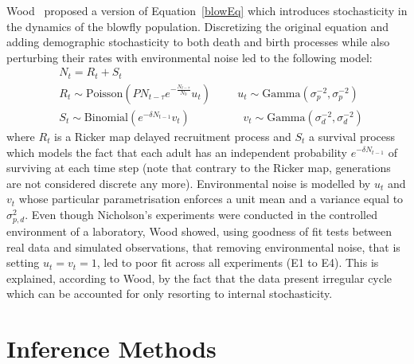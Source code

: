 \documentclass[12pt]{article}
\begin{document}
	Wood~\cite{wood2010statistical} proposed a version of Equation~\ref{blowEq} which introduces stochasticity in the dynamics of the blowfly population. Discretizing the original equation and adding demographic stochasticity to both death and birth processes while also perturbing their rates with environmental noise led to the following model:
	\begin{align}
	& N_t = R_t + S_t \\
	& R_t \sim  \mathrm{Poisson}(PN_{t-\tau}e^{-\frac{N_{t-\tau}}{N_0}}u_t)  \hspace{1cm} u_t \sim \mathrm{Gamma}(\sigma_p^{-2}, \sigma_p^{-2})\\ 
	& S_t \sim \mathrm{Binomial}(e^{-\delta N_{t-1}}v_t) \hspace{2cm}  v_t \sim \mathrm{Gamma}(\sigma_d^{-2}, \sigma_d^{-2}) 
	\end{align}
	where $R_t$ is a Ricker map delayed recruitment process and $S_t$ a survival process which models the fact that each adult has
	an independent probability $e^{-\delta N_{t-1}}$ of surviving at each time step (note that contrary to the Ricker map, generations are not considered discrete any more). Environmental noise is modelled by $u_t$ and $v_t$ whose particular parametrisation enforces a unit mean and a variance equal to $\sigma_{p,d}^2$. Even though Nicholson's experiments were conducted in the controlled environment of a laboratory, Wood showed, using goodness of fit tests between real data and simulated observations, that removing environmental noise, that is setting $u_t=v_t=1$, led to poor fit across all experiments (E1 to E4). This is explained, according to Wood, by the fact that the data present irregular cycle which can be accounted for only resorting to internal stochasticity.

	\section{Inference Methods}
\end{document}
